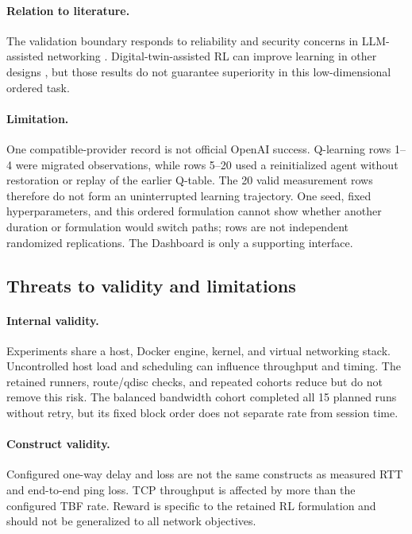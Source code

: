 \paragraph{Relation to literature.} The validation boundary responds to reliability and security concerns in LLM-assisted networking \citep{lira2025llmnetcfg,liu2025llmnetworking}. Digital-twin-assisted RL can improve learning in other designs \citep{guemes2022accelerating,cheng2025dtrl}, but those results do not guarantee superiority in this low-dimensional ordered task.

\paragraph{Limitation.} One compatible-provider record is not official OpenAI success. Q-learning rows 1--4 were migrated observations, while rows 5--20 used a reinitialized agent without restoration or replay of the earlier Q-table. The 20 valid measurement rows therefore do not form an uninterrupted learning trajectory. One seed, fixed hyperparameters, and this ordered formulation cannot show whether another duration or formulation would switch paths; rows are not independent randomized replications. The Dashboard is only a supporting interface.

\subsection{Threats to validity and limitations}

\paragraph{Internal validity.} Experiments share a host, Docker engine, kernel, and virtual networking stack. Uncontrolled host load and scheduling can influence throughput and timing. The retained runners, route/qdisc checks, and repeated cohorts reduce but do not remove this risk. The balanced bandwidth cohort completed all 15 planned runs without retry, but its fixed block order does not separate rate from session time.

\paragraph{Construct validity.} Configured one-way delay and loss are not the same constructs as measured RTT and end-to-end ping loss. TCP throughput is affected by more than the configured TBF rate. Reward is specific to the retained RL formulation and should not be generalized to all network objectives.

